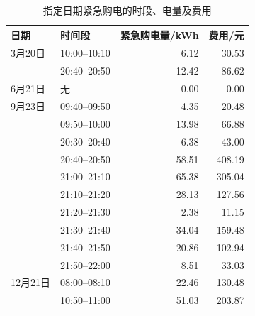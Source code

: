 \begin{table}[!htbp]
\centering
\caption{指定日期紧急购电的时段、电量及费用}
\label{tab:q3_emergency}
\small
\setlength{\tabcolsep}{5pt}
\begin{tabular}{llrr}
\toprule
日期 & 时间段 & 紧急购电量/kWh & 费用/元 \\
\midrule
3月20日 & 10:00--10:10 & 6.12 & 30.53 \\
 & 20:40--20:50 & 12.42 & 86.62 \\
6月21日 & 无 & 0.00 & 0.00 \\
9月23日 & 09:40--09:50 & 4.35 & 20.48 \\
 & 09:50--10:00 & 13.98 & 66.88 \\
 & 20:30--20:40 & 6.38 & 43.00 \\
 & 20:40--20:50 & 58.51 & 408.19 \\
 & 21:00--21:10 & 65.38 & 305.04 \\
 & 21:10--21:20 & 28.13 & 127.56 \\
 & 21:20--21:30 & 2.38 & 11.15 \\
 & 21:30--21:40 & 34.04 & 159.48 \\
 & 21:40--21:50 & 20.86 & 102.94 \\
 & 21:50--22:00 & 8.51 & 33.03 \\
12月21日 & 08:00--08:10 & 22.46 & 130.48 \\
 & 10:50--11:00 & 51.03 & 203.87 \\
\bottomrule
\end{tabular}
\end{table}
